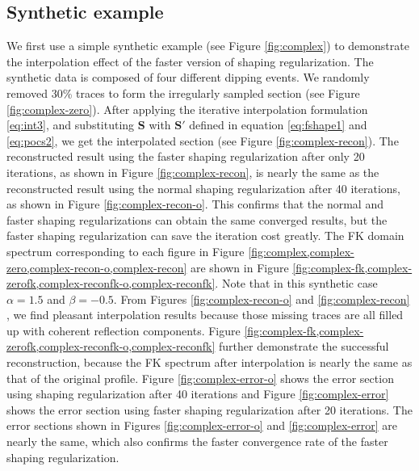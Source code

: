 \subsection{Synthetic example}
We first use a simple synthetic example (see Figure \ref{fig:complex}) to demonstrate the interpolation effect of the faster version of shaping regularization. The synthetic data is composed of four different dipping events. We randomly removed 30\% traces to form the irregularly sampled section (see Figure \ref{fig:complex-zero}). After applying the iterative interpolation formulation \ref{eq:int3}, and substituting $\mathbf{S}$ with $\mathbf{S}'$ defined in equation \ref{eq:fshape1} and \ref{eq:pocs2}, we get the interpolated section (see Figure \ref{fig:complex-recon}). The reconstructed result using the faster shaping regularization after only 20 iterations, as shown in Figure \ref{fig:complex-recon}, is nearly the same as the reconstructed result using the normal shaping regularization after 40 iterations, as shown in Figure \ref{fig:complex-recon-o}. This confirms that the normal and faster shaping regularizations can obtain the same converged results, but the faster shaping regularization can save the iteration cost greatly.%
The FK domain spectrum corresponding to each figure in Figure \ref{fig:complex,complex-zero,complex-recon-o,complex-recon} are shown in Figure \ref{fig:complex-fk,complex-zerofk,complex-reconfk-o,complex-reconfk}. Note that in this synthetic case $\alpha=1.5$ and $\beta=-0.5$.
From Figures \ref{fig:complex-recon-o} and \ref{fig:complex-recon} , we find pleasant interpolation results because those missing traces are all filled up with coherent reflection components. Figure \ref{fig:complex-fk,complex-zerofk,complex-reconfk-o,complex-reconfk} further demonstrate the successful reconstruction, because the FK spectrum after interpolation is nearly the same as that of the original profile. Figure \ref{fig:complex-error-o} shows the error section using shaping regularization after 40 iterations and Figure \ref{fig:complex-error} shows the error section using faster shaping regularization after 20 iterations. The error sections shown in Figures \ref{fig:complex-error-o} and \ref{fig:complex-error} are nearly the same, which also confirms the faster convergence rate of the faster shaping regularization.

